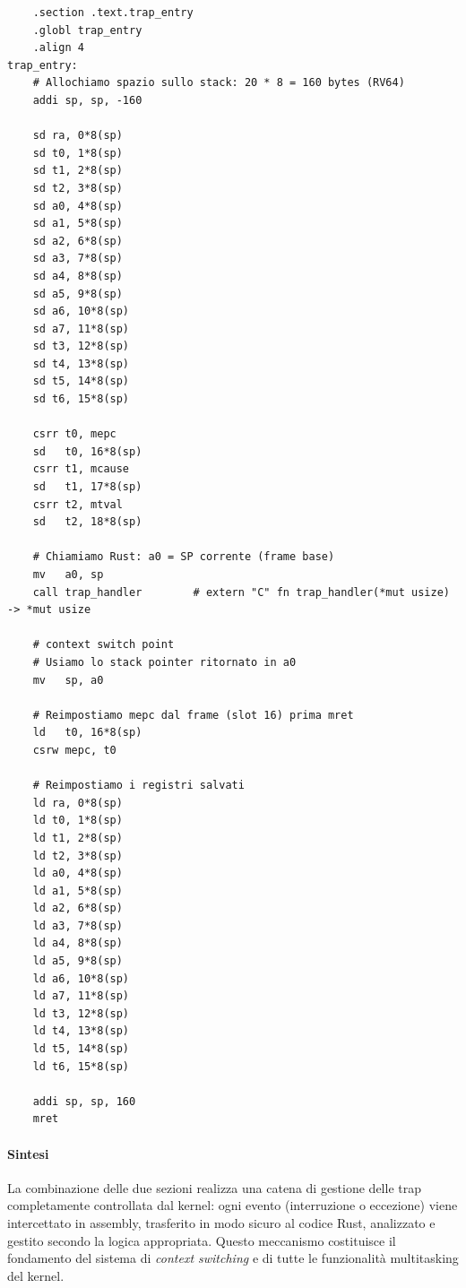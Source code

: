 \documentclass[italian, Lau, oneside]{sapthesis} %
\begin{document}
\begin{center}
\begin{verbatim}
    .section .text.trap_entry
    .globl trap_entry
    .align 4
trap_entry:
    # Allochiamo spazio sullo stack: 20 * 8 = 160 bytes (RV64)
    addi sp, sp, -160

    sd ra, 0*8(sp)
    sd t0, 1*8(sp)
    sd t1, 2*8(sp)
    sd t2, 3*8(sp)
    sd a0, 4*8(sp)
    sd a1, 5*8(sp)
    sd a2, 6*8(sp)
    sd a3, 7*8(sp)
    sd a4, 8*8(sp)
    sd a5, 9*8(sp)
    sd a6, 10*8(sp)
    sd a7, 11*8(sp)
    sd t3, 12*8(sp)
    sd t4, 13*8(sp)
    sd t5, 14*8(sp)
    sd t6, 15*8(sp)

    csrr t0, mepc
    sd   t0, 16*8(sp)
    csrr t1, mcause
    sd   t1, 17*8(sp)
    csrr t2, mtval
    sd   t2, 18*8(sp)

    # Chiamiamo Rust: a0 = SP corrente (frame base)
    mv   a0, sp
    call trap_handler        # extern "C" fn trap_handler(*mut usize) -> *mut usize

    # context switch point 
    # Usiamo lo stack pointer ritornato in a0
    mv   sp, a0

    # Reimpostiamo mepc dal frame (slot 16) prima mret
    ld   t0, 16*8(sp)
    csrw mepc, t0

    # Reimpostiamo i registri salvati
    ld ra, 0*8(sp)
    ld t0, 1*8(sp)
    ld t1, 2*8(sp)
    ld t2, 3*8(sp)
    ld a0, 4*8(sp)
    ld a1, 5*8(sp)
    ld a2, 6*8(sp)
    ld a3, 7*8(sp)
    ld a4, 8*8(sp)
    ld a5, 9*8(sp)
    ld a6, 10*8(sp)
    ld a7, 11*8(sp)
    ld t3, 12*8(sp)
    ld t4, 13*8(sp)
    ld t5, 14*8(sp)
    ld t6, 15*8(sp)

    addi sp, sp, 160
    mret
\end{verbatim}
\end{center}

\paragraph{Sintesi}
La combinazione delle due sezioni realizza una catena di gestione delle trap completamente controllata dal kernel:  
ogni evento (interruzione o eccezione) viene intercettato in assembly, trasferito in modo sicuro al codice Rust, analizzato e gestito secondo la logica appropriata.  
Questo meccanismo costituisce il fondamento del sistema di \emph{context switching} e di tutte le funzionalità multitasking del kernel.
\end{document}
